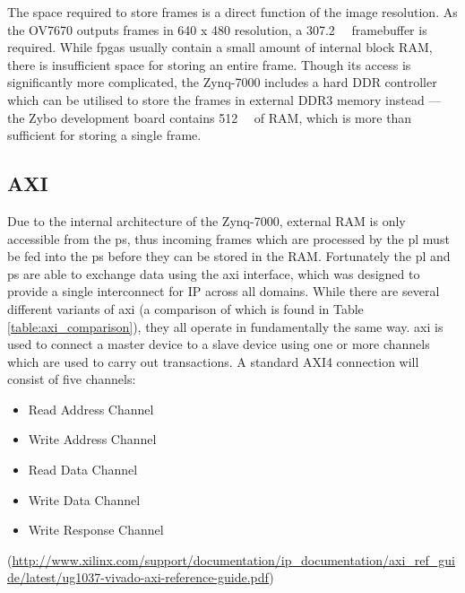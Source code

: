 The space required to store frames is a direct function of the image resolution. As the OV7670 outputs frames in 640 x 480 resolution, a \SI{307.2}{\kilo\byte} framebuffer is required. While \glspl{fpga} usually contain a small amount of internal block RAM, there is insufficient space for storing an entire frame. Though its access is significantly more complicated, the Zynq-7000 includes a hard DDR controller which can be utilised to store the frames in external DDR3 memory instead --- the Zybo development board contains \SI{512}{\mega\byte} of RAM, which is more than sufficient for storing a single frame.

\subsection{AXI}
Due to the internal architecture of the Zynq-7000, external RAM is only accessible from the \gls{ps}, thus incoming frames which are processed by the \gls{pl} must be fed into the \gls{ps} before they can be stored in the RAM. Fortunately the \gls{pl} and \gls{ps} are able to exchange data using the \gls{axi} interface, which was designed to provide a single interconnect for IP across all domains. While there are several different variants of \gls{axi} (a comparison of which is found in Table \ref{table:axi_comparison}), they all operate in fundamentally the same way. \gls{axi} is used to connect a master device to a slave device using one or more channels which are used to carry out transactions. A standard AXI4 connection will consist of five channels:
\begin{itemize}
  \item Read Address Channel
  \item Write Address Channel
  \item Read Data Channel
  \item Write Data Channel
  \item Write Response Channel
\end{itemize}
(\url{http://www.xilinx.com/support/documentation/ip_documentation/axi_ref_guide/latest/ug1037-vivado-axi-reference-guide.pdf})

